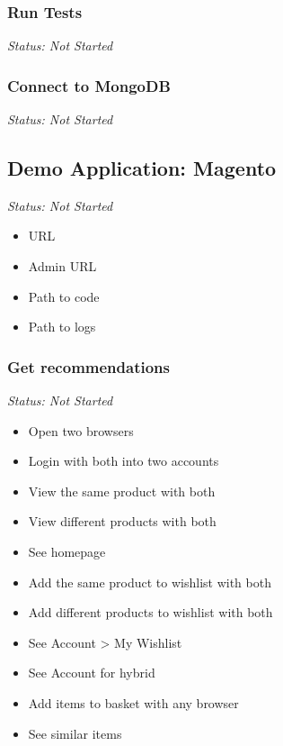 \subsubsection{Run Tests}

\emph{Status: Not Started}

\subsubsection{Connect to MongoDB}

\emph{Status: Not Started}



\subsection{Demo Application: Magento}

\emph{Status: Not Started}

\begin{itemize}
\item URL
\item Admin URL
\item Path to code
\item Path to logs
\end{itemize}

\subsubsection{Get recommendations}

\emph{Status: Not Started}

\begin{itemize}
\item Open two browsers
\item Login with both into two accounts
\item View the same product with both
\item View different products with both
\item See homepage
\item Add the same product to wishlist with both
\item Add different products to wishlist with both
\item See Account > My Wishlist
\item See Account for hybrid
\item Add items to basket with any browser
\item See similar items
\end{itemize}

